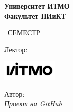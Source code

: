 \begin{titlepage}
	\clearpage\thispagestyle{empty}
	\centering
	
	\textbf{Университет ИТМО \\ Факультет ПИиКТ}
	\vspace{33ex}
	
	{\textbf{\FullCourseNameFirstPart}}
	
	\SemesterNumber\ СЕМЕСТР  
	\vspace{1ex}
	
	Лектор: \textit{\LecturerInitials}
	
	
	\includegraphics[width=0.2\textwidth]{images/logo_ltc.png}

	\begin{flushright}
		\noindent
		Автор: \href{\VKLink}{\textit{\AuthorInitials}}\\
		\href{\GithubLink}{\textit{Проект на GitHub}}\\
		
	\end{flushright}
	
	\vfill
	\CourseDate
	\pagebreak
\end{titlepage}
